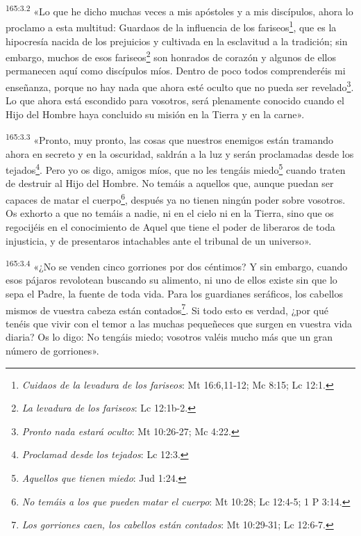 \par
\textsuperscript{165:3.2} «Lo que he dicho muchas veces a mis apóstoles y a mis discípulos, ahora lo proclamo a esta multitud: Guardaos de la influencia de los fariseos\footnote{\textit{Cuidaos de la levadura de los fariseos}: Mt 16:6,11-12; Mc 8:15; Lc 12:1.}, que es la hipocresía nacida de los prejuicios y cultivada en la esclavitud a la tradición; sin embargo, muchos de esos fariseos\footnote{\textit{La levadura de los fariseos}: Lc 12:1b-2.} son honrados de corazón y algunos de ellos permanecen aquí como discípulos míos. Dentro de poco todos comprenderéis mi enseñanza, porque no hay nada que ahora esté oculto que no pueda ser revelado\footnote{\textit{Pronto nada estará oculto}: Mt 10:26-27; Mc 4:22.}. Lo que ahora está escondido para vosotros, será plenamente conocido cuando el Hijo del Hombre haya concluido su misión en la Tierra y en la carne».

\par
\textsuperscript{165:3.3} «Pronto, muy pronto, las cosas que nuestros enemigos están tramando ahora en secreto y en la oscuridad, saldrán a la luz y serán proclamadas desde los tejados\footnote{\textit{Proclamad desde los tejados}: Lc 12:3.}. Pero yo os digo, amigos míos, que no les tengáis miedo\footnote{\textit{Aquellos que tienen miedo}: Jud 1:24.} cuando traten de destruir al Hijo del Hombre. No temáis a aquellos que, aunque puedan ser capaces de matar el cuerpo\footnote{\textit{No temáis a los que pueden matar el cuerpo}: Mt 10:28; Lc 12:4-5; 1 P 3:14.}, después ya no tienen ningún poder sobre vosotros. Os exhorto a que no temáis a nadie, ni en el cielo ni en la Tierra, sino que os regocijéis en el conocimiento de Aquel que tiene el poder de liberaros de toda injusticia, y de presentaros intachables ante el tribunal de un universo».

\par
\textsuperscript{165:3.4} «¿No se venden cinco gorriones por dos céntimos? Y sin embargo, cuando esos pájaros revolotean buscando su alimento, ni uno de ellos existe sin que lo sepa el Padre, la fuente de toda vida. Para los guardianes seráficos, los cabellos mismos de vuestra cabeza están contados\footnote{\textit{Los gorriones caen, los cabellos están contados}: Mt 10:29-31; Lc 12:6-7.}. Si todo esto es verdad, ¿por qué tenéis que vivir con el temor a las muchas pequeñeces que surgen en vuestra vida diaria? Os lo digo: No tengáis miedo; vosotros valéis mucho más que un gran número de gorriones».


